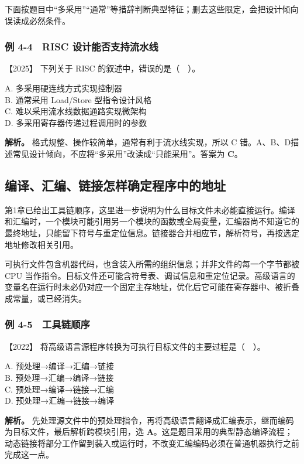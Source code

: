 下面按题目中``多采用''``通常''等措辞判断典型特征；删去这些限定，会把设计倾向误读成必然条件。

\subsubsection{例 4-4　RISC 设计能否支持流水线}\label{co-ex4-4}

\noindent{}【2025】 下列关于 RISC 的叙述中，错误的是（　）。

A. 多采用硬连线方式实现控制器\\
B. 通常采用 Load/Store 型指令设计风格\\
C. 难以采用流水线数据通路实现微架构\\
D. 多采用寄存器传递过程调用时的参数


\textbf{解析。} 格式规整、操作较简单，通常有利于流水线实现，所以 C 错。A、B、D描述常见设计倾向，不应将``多采用''改读成``只能采用''。答案为 \textbf{C}。

\subsection{编译、汇编、链接怎样确定程序中的地址}\label{co-04-05}

第1章已给出工具链顺序，这里进一步说明为什么目标文件未必能直接运行。编译和汇编时，一个模块可能引用另一个模块的函数或全局变量，汇编器尚不知道它的最终地址，只能留下符号与重定位信息。链接器合并相应节，解析符号，再按选定地址修改相关引用。

可执行文件包含机器代码，也含装入所需的组织信息；并非文件的每一个字节都被 CPU 当作指令。目标文件还可能含符号表、调试信息和重定位记录。高级语言的变量名在运行时未必仍对应一个固定主存地址，优化后它可能在寄存器中、被折叠成常量，或已经消失。

\subsubsection{例 4-5　工具链顺序}\label{co-ex4-5}

\noindent{}【2022】 将高级语言源程序转换为可执行目标文件的主要过程是（　）。

A. 预处理→编译→汇编→链接\\
B. 预处理→汇编→编译→链接\\
C. 预处理→编译→链接→汇编\\
D. 预处理→汇编→链接→编译


\textbf{解析。} 先处理源文件中的预处理指令，再将高级语言翻译成汇编表示，继而编码为目标文件，最后解析跨模块引用，选 \textbf{A}。这是题目采用的典型静态编译流程；动态链接将部分工作留到装入或运行时，不改变汇编编码必须在普通机器执行之前完成这一点。

